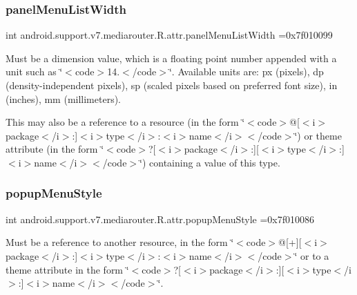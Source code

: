 \subsubsection{\texorpdfstring{panel\+Menu\+List\+Width}{panelMenuListWidth}}
{\footnotesize\ttfamily int android.\+support.\+v7.\+mediarouter.\+R.\+attr.\+panel\+Menu\+List\+Width =0x7f010099\hspace{0.3cm}{\ttfamily [static]}}

Must be a dimension value, which is a floating point number appended with a unit such as \char`\"{}$<$code$>$14.\+5sp$<$/code$>$\char`\"{}. Available units are\+: px (pixels), dp (density-\/independent pixels), sp (scaled pixels based on preferred font size), in (inches), mm (millimeters). 

This may also be a reference to a resource (in the form \char`\"{}$<$code$>$@\mbox{[}$<$i$>$package$<$/i$>$\+:\mbox{]}$<$i$>$type$<$/i$>$\+:$<$i$>$name$<$/i$>$$<$/code$>$\char`\"{}) or theme attribute (in the form \char`\"{}$<$code$>$?\mbox{[}$<$i$>$package$<$/i$>$\+:\mbox{]}\mbox{[}$<$i$>$type$<$/i$>$\+:\mbox{]}$<$i$>$name$<$/i$>$$<$/code$>$\char`\"{}) containing a value of this type. \mbox{\label{classandroid_1_1support_1_1v7_1_1mediarouter_1_1R_1_1attr_a12b442d2a68fa9805515836034d2148e}} 
\subsubsection{\texorpdfstring{popup\+Menu\+Style}{popupMenuStyle}}
{\footnotesize\ttfamily int android.\+support.\+v7.\+mediarouter.\+R.\+attr.\+popup\+Menu\+Style =0x7f010086\hspace{0.3cm}{\ttfamily [static]}}

Must be a reference to another resource, in the form \char`\"{}$<$code$>$@\mbox{[}+\mbox{]}\mbox{[}$<$i$>$package$<$/i$>$\+:\mbox{]}$<$i$>$type$<$/i$>$\+:$<$i$>$name$<$/i$>$$<$/code$>$\char`\"{} or to a theme attribute in the form \char`\"{}$<$code$>$?\mbox{[}$<$i$>$package$<$/i$>$\+:\mbox{]}\mbox{[}$<$i$>$type$<$/i$>$\+:\mbox{]}$<$i$>$name$<$/i$>$$<$/code$>$\char`\"{}. \mbox{\label{classandroid_1_1support_1_1v7_1_1mediarouter_1_1R_1_1attr_af485292b7952a70814e465517913886a}} 
